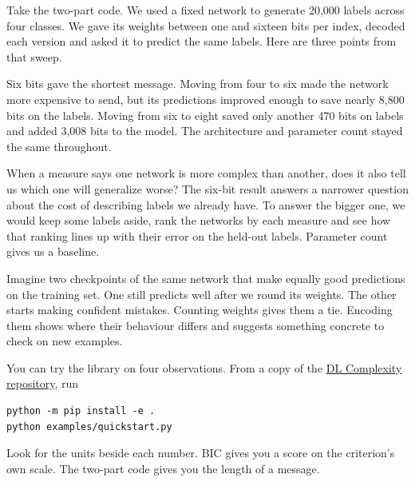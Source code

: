 \documentclass[11pt,a4paper]{article}
\newcommand{\head}[1]{\par\medskip{\large\sffamily\bfseries\color{sea}#1}\par}
\begin{document}
Take the two-part code. We used a fixed network to generate 20,000 labels across four classes. We gave its weights between one and sixteen bits per index, decoded each version and asked it to predict the same labels. Here are three points from that sweep.
\begin{center}
\end{center}
Six bits gave the shortest message. Moving from four to six made the network more expensive to send, but its predictions improved enough to save nearly 8,800 bits on the labels. Moving from six to eight saved only another 470 bits on labels and added 3,008 bits to the model. The architecture and parameter count stayed the same throughout.
\head{What we want to find out}
When a measure says one network is more complex than another, does it also tell us which one will generalize worse? The six-bit result answers a narrower question about the cost of describing labels we already have. To answer the bigger one, we would keep some labels aside, rank the networks by each measure and see how that ranking lines up with their error on the held-out labels. Parameter count gives us a baseline.
\head{Why it matters}
Imagine two checkpoints of the same network that make equally good predictions on the training set. One still predicts well after we round its weights. The other starts making confident mistakes. Counting weights gives them a tie. Encoding them shows where their behaviour differs and suggests something concrete to check on new examples.
\head{Follow along}
You can try the library on four observations. From a copy of the \href{https://github.com/intsystems/dl-complexity}{DL Complexity repository}, run
\begin{verbatim}
python -m pip install -e .
python examples/quickstart.py
\end{verbatim}
Look for the units beside each number. BIC gives you a score on the criterion's own scale. The two-part code gives you the length of a message.
\end{document}
